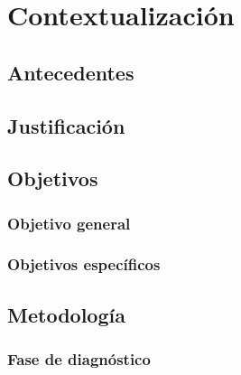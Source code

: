 \chapter{Contextualización}

\section{Antecedentes}

\section{Justificación}


\section{Objetivos}

\subsection{Objetivo general}
\subsection{Objetivos específicos}

\section{Metodología}

\subsection{Fase de diagnóstico}


